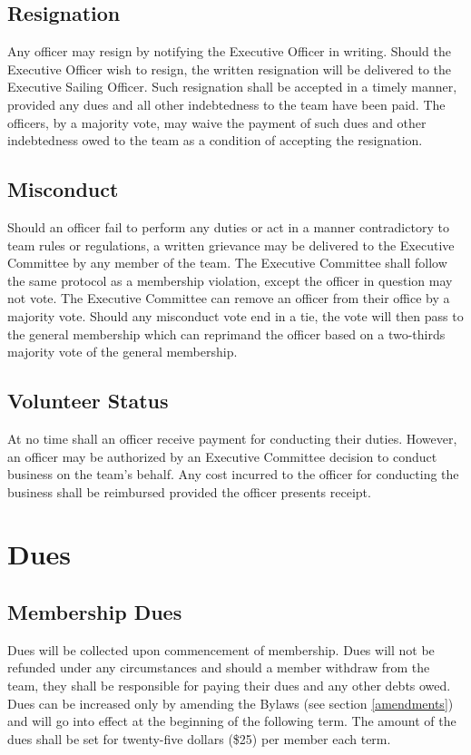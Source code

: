 \documentclass[12pt,titlepage,letter]{article}
\begin{document}
\subsection{Resignation}
Any officer may resign by notifying the Executive Officer in writing. Should the Executive Officer wish to resign, the written resignation will be delivered to the Executive Sailing Officer. Such resignation shall be accepted in a timely manner, provided any dues and all other indebtedness to the team have been paid.  The officers, by a majority vote, may waive the payment of such dues and other indebtedness owed to the team as a condition of accepting the resignation.

\subsection{Misconduct}
Should an officer fail to perform any duties or act in a manner contradictory to team rules or regulations, a written grievance may be delivered to the Executive Committee by any member of the team. The Executive Committee shall follow the same protocol as a membership violation, except the officer in question may not vote. The Executive Committee can remove an officer from their office by a majority vote. Should any misconduct vote end in a tie, the vote will then pass to the general membership which can reprimand the officer based on a two-thirds majority vote of the general membership.

\subsection{Volunteer Status}
At no time shall an officer receive payment for conducting their duties. However, an officer may be authorized by an Executive Committee decision to conduct business on the team's behalf. Any cost incurred to the officer for conducting the business shall be reimbursed provided the officer presents receipt.

\section{Dues}
\subsection{Membership Dues}
	Dues will be collected upon commencement of membership. Dues will not be refunded under any circumstances and should a member withdraw from the team, they shall be responsible for paying their dues and any other debts owed. Dues can be increased only by amending the Bylaws (see section \ref{amendments}) and will go into effect at the beginning of the following term. The amount of the dues shall be set for twenty-five dollars (\$25) per member each term.
\end{document}
